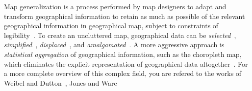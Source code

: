 \documentclass[11pt, oneside]{report}
\begin{document}
{%


Map generalization is a process performed by map designers to adapt and transform geographical information to retain as much as possible of the relevant geographical information in geographical map, subject to constraints of legibility~\cite{weibel1999generalising}. To create an uncluttered map, geographical data can be \emph{selected}~\cite{sarma2012fusiontables}, \emph{simplified}~\cite{douglas1973algorithms},  \emph{displaced}~\cite{lonergan2001iterative}, and \emph{amalgamated}~\cite{haunert2006landcover}. A more aggressive approach is \emph{statistical aggregation} of geographical information, such as the choropleth map, which eliminates the explicit representation of geographical data altogether~\cite{friendly2008milestones}. For a more complete overview of this complex field, you are refered to the works of Weibel and Dutton~\cite{weibel1999generalising}, Jones and Ware~\cite{jones2005webage}

}
\end{document}
